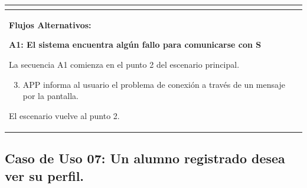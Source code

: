 \begin{longtable}{|l|p{5.5cm}|l|p{2cm}|l|p{1.9cm}|}
{    } \\ \hline

    \multicolumn{6}{|p{15cm}|}{ \textbf{Flujos Alternativos: }
    
    \textbf{A1: El sistema encuentra algún fallo para comunicarse con S}
    
    La secuencia A1 comienza en el punto 2 del escenario principal.
    \begin{enumerate}
        \setcounter{enumi}{2}
        \item APP informa al usuario el problema de conexión a través de un mensaje por la pantalla.
    \end{enumerate}

    El escenario vuelve al punto 2.

    } \\ \hline

\end{longtable}


\subsection{Caso de Uso 07: Un alumno registrado desea ver su perfil.}

